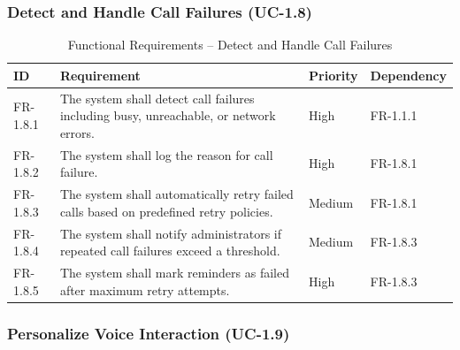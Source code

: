 \documentclass[12pt,a4paper]{report}
\begin{document}
\subsubsection{Detect and Handle Call Failures (UC-1.8)}

\begin{table}[H]
\centering
\caption{Functional Requirements – Detect and Handle Call Failures}
\begin{tabularx}{\textwidth}{|l|X|l|l|}
\hline
\textbf{ID} & \textbf{Requirement} & \textbf{Priority} & \textbf{Dependency} \\ \hline

FR-1.8.1 & The system shall detect call failures including busy, unreachable, or network errors. & High & FR-1.1.1 \\ \hline

FR-1.8.2 & The system shall log the reason for call failure. & High & FR-1.8.1 \\ \hline

FR-1.8.3 & The system shall automatically retry failed calls based on predefined retry policies. & Medium & FR-1.8.1 \\ \hline

FR-1.8.4 & The system shall notify administrators if repeated call failures exceed a threshold. & Medium & FR-1.8.3 \\ \hline

FR-1.8.5 & The system shall mark reminders as failed after maximum retry attempts. & High & FR-1.8.3 \\ \hline

\end{tabularx}
\end{table}
\subsubsection{Personalize Voice Interaction (UC-1.9)}
\end{document}
